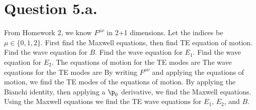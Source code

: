 \documentclass{article}
\begin{document}
\section*{Question 5.a.}
From Homework 2, we know $F^{\mu\nu}$ in 2+1 dimensions. Let the indices be $\mu\in\{0,1,2\}$. First find the Maxwell equations, then find TE equation of motion.
Find the wave equation for $B$.
Find the wave equation for $E_1$.
Find the wave equation for $E_2$.
The equations of motion for the TE modes are
The wave equations for the TE modes are
By writing $F^{\mu\nu}$ and applying the equations of motion, we find the TE modes of the equations of motion. By applying the Bianchi identity, then applying a $\p_0$ derivative, we find the Maxwell equations. Using the Maxwell equations we find the TE wave equations for $E_1$, $E_2$, and $B$.
\end{document}
